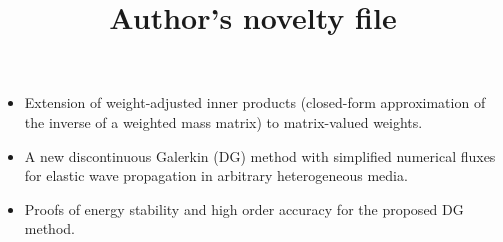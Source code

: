 \documentclass[10pt]{article}
\title{Author's novelty file}
\date{}
\author{}
\begin{document}
\maketitle
\begin{itemize}
\item Extension of weight-adjusted inner products (closed-form approximation of the inverse of a weighted mass matrix) to matrix-valued weights.  
\item A new discontinuous Galerkin (DG) method with simplified numerical fluxes for elastic wave propagation in arbitrary heterogeneous media.  
\item Proofs of energy stability and high order accuracy for the proposed DG method.  
\end{itemize}
\end{document}
